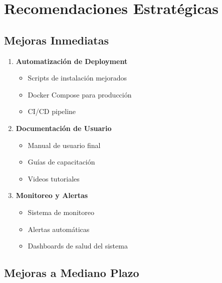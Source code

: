 \documentclass[12pt,a4paper]{article}
\begin{document}
\section{Recomendaciones Estratégicas}

\subsection{Mejoras Inmediatas}

\begin{enumerate}
    \item \textbf{Automatización de Deployment}
    \begin{itemize}
        \item Scripts de instalación mejorados
        \item Docker Compose para producción
        \item CI/CD pipeline
    \end{itemize}
    
    \item \textbf{Documentación de Usuario}
    \begin{itemize}
        \item Manual de usuario final
        \item Guías de capacitación
        \item Videos tutoriales
    \end{itemize}
    
    \item \textbf{Monitoreo y Alertas}
    \begin{itemize}
        \item Sistema de monitoreo
        \item Alertas automáticas
        \item Dashboards de salud del sistema
    \end{itemize}
\end{enumerate}

\subsection{Mejoras a Mediano Plazo}
\end{document}
